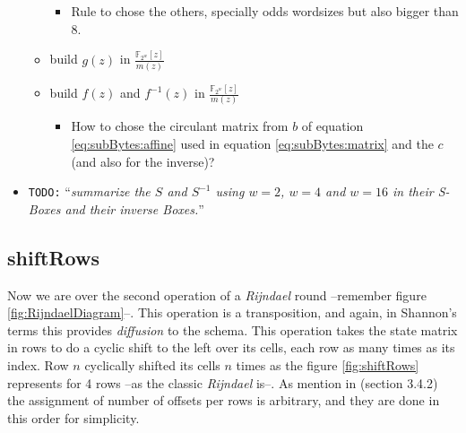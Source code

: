 \documentclass[10pt,a4paper,twoside]{llncs}
\newcommand{\todo}[1]{\texttt{\color{red}TODO:} ``\emph{#1}''}
\newcommand{\Fpn}[2]{\ensuremath{\mathbb{F}_{#1^#2}}}
\newcommand{\Fpnm}[2]{\ensuremath{\frac{\Fpn{2}{#1}[#2]}{m(#2)}}}
\begin{document}
\begin{itemize}
\begin{itemize}
\begin{itemize}
   \item Rule to chose the others, specially odds wordsizes but also bigger than $8$.
  \end{itemize}
  \item build $g(z)$ in \Fpnm{w}{z}
  \item build $f(z)$ and $f^{-1}(z)$ in \Fpnm{w}{z}
  \begin{itemize}
   \item How to chose the circulant matrix from $b$ of equation \ref{eq:subBytes:affine} used in equation \ref{eq:subBytes:matrix} and the $c$ (and also for the inverse)?
  \end{itemize}
 \end{itemize}
 \item \todo{summarize the $S$ and $S^{-1}$ using $w=2$, $w=4$ and $w=16$ in their \emph{S-Box}es and their inverse Boxes.}
\end{itemize}


\subsection{shiftRows}\label{sec:shiftRows}
Now we are over the second operation of a \emph{Rijndael} round --remember figure \ref{fig:RijndaelDiagram}--. This operation is a transposition, and again, in Shannon's terms this provides \emph{diffusion} to the schema. This operation takes the state matrix in rows to do a cyclic shift to the left over its cells, each row as many times as its index. Row $n$ cyclically shifted its cells $n$ times as the figure \ref{fig:shiftRows} represents for 4 rows --as the classic \emph{Rijndael} is--. As mention in \cite{Daemen:2002:DR:560131} (section 3.4.2) the assignment of number of offsets per rows is arbitrary, and they are done in this order for simplicity.

\end{document}

